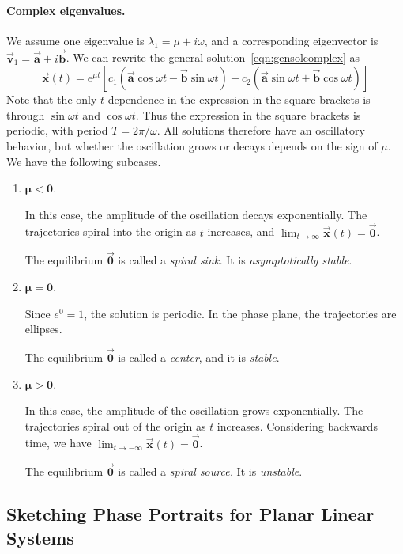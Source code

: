\documentclass{book}
\newcommand{\BA}{\vec{\textbf{a}}}
\newcommand{\BB}{\vec{\textbf{b}}}
\newcommand{\BV}{\vec{\textbf{v}}}
\newcommand{\BX}{\vec{\textbf{x}}}
\newcommand{\BZ}{\vec{\textbf{0}}}  %
\newcommand{\ds}{\displaystyle}
\begin{document}
\paragraph{Complex eigenvalues.}
We assume one eigenvalue is $\lambda_1 = \mu + i\omega$,
and a corresponding eigenvector is
$\BV_1 = \BA+i\BB$.
We can rewrite the general solution~\eqref{eqn:gensolcomplex}
as
\begin{equation}
\BX(t) = 
     e^{\mu t} \left[ c_1 \left(\BA\cos\omega t - \BB\sin\omega t \right)
         + c_2 \left(\BA\sin\omega t + \BB\cos\omega t\right)\right]
\end{equation}
Note that the only $t$ dependence in the expression in the square
brackets is through $\sin\omega t$ and $\cos\omega t$.
Thus the expression in the square brackets is periodic, with
period $T = 2\pi/\omega$.
All solutions therefore have an oscillatory behavior, 
but whether the oscillation grows or decays depends on the
sign of $\mu$.
We have the following subcases.
\begin{enumerate}

\item $\pmb{\mu < 0}$.

In this case, the amplitude of the oscillation decays
exponentially.
The trajectories spiral into the origin as $t$ increases,
and $\ds\lim_{t\rightarrow\infty} \BX(t) = \BZ$.

The equilibrium $\BZ$ is called a \emph{spiral sink.}
It is \emph{asymptotically stable}.

\item $\pmb{\mu = 0}$.

Since $e^{0}=1$, the solution is periodic.
In the phase plane, the trajectories are ellipses.

The equilibrium $\BZ$ is called a \emph{center}, and it is
\emph{stable}.

\item $\pmb{\mu > 0}$.

In this case, the amplitude of the oscillation grows
exponentially.
The trajectories spiral out of the origin as $t$ increases.
Considering backwards time, we have
$\ds \lim_{t\rightarrow-\infty} \BX(t) = \BZ$.

The equilibrium $\BZ$ is called a \emph{spiral source.}
It is \emph{unstable}.
\end{enumerate}

\subsection*{Sketching Phase Portraits for Planar Linear Systems}
\end{document}
